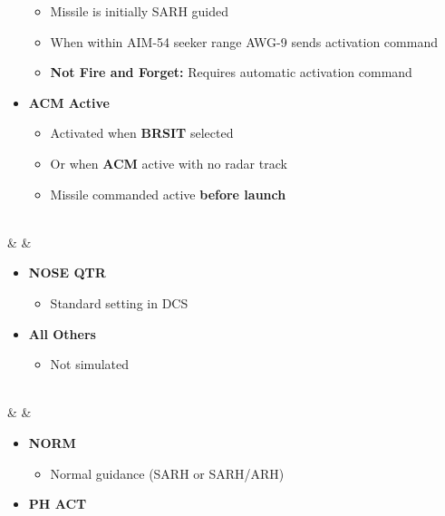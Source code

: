\documentclass[fontInter]{TechCheck}
\begin{document}
\begin{listlongtable}
\begin{minipage}[t]{\linewidth}
\begin{itemize}
\begin{itemize}
					\item Missile is initially SARH guided
					\item When within AIM-54 seeker range AWG-9 sends activation command
					\item \textbf{Not Fire and Forget:} Requires automatic activation command
				\end{itemize}
				\item \textbf{ACM Active}
				\begin{itemize}
					\item Activated when \textbf{BRSIT} selected
					\item Or when \textbf{ACM} active with no radar track
					\item Missile commanded active \textbf{before launch}
				\end{itemize}
			\end{itemize}
		\end{minipage} \\
		\midrule
		\textbf{\textbullet} &   &
		\begin{minipage}[t]{\linewidth}
			\vspace{-7pt}
			\begin{itemize}
				\item \textbf{NOSE QTR}
				\begin{itemize}
					\item Standard setting in DCS
				\end{itemize}
				\item \textbf{All Others}
				\begin{itemize}
					\item Not simulated
				\end{itemize}
			\end{itemize}
		\end{minipage} \\
		\midrule
		\textbf{\textbullet} &   &
		\begin{minipage}[t]{\linewidth}
			\vspace{-7pt}
			\begin{itemize}
				\item \textbf{NORM}
				\begin{itemize}
					\item Normal guidance (SARH or SARH/ARH)
				\end{itemize}
				\item \textbf{PH ACT}
				\begin{itemize}

\end{itemize}
\end{itemize}
\end{minipage}
\end{listlongtable}
\end{document}

